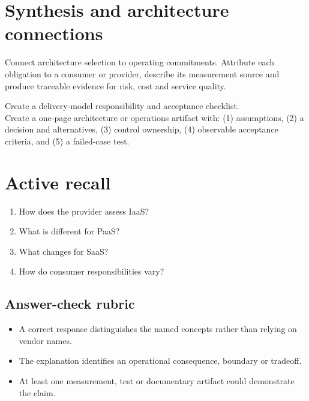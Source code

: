 \documentclass[10pt,letterpaper]{article}
\begin{document}
\section{Synthesis and architecture connections}
Connect architecture selection to operating commitments. Attribute each obligation to a consumer or provider, describe its measurement source and produce traceable evidence for risk, cost and service quality.
\begin{workbox}[title={Applied deliverable}]
Create a delivery-model responsibility and acceptance checklist.\\[4pt]Create a one-page architecture or operations artifact with: (1) assumptions, (2) a decision and alternatives, (3) control ownership, (4) observable acceptance criteria, and (5) a failed-case test.
\end{workbox}
\section{Active recall}
\begin{enumerate}
\item How does the provider assess IaaS?
\item What is different for PaaS?
\item What changes for SaaS?
\item How do consumer responsibilities vary?
\end{enumerate}
\subsection{Answer-check rubric}
\begin{itemize}
\item A correct response distinguishes the named concepts rather than relying on vendor names.
\item The explanation identifies an operational consequence, boundary or tradeoff.
\item At least one measurement, test or documentary artifact could demonstrate the claim.
\end{itemize}
\end{document}
